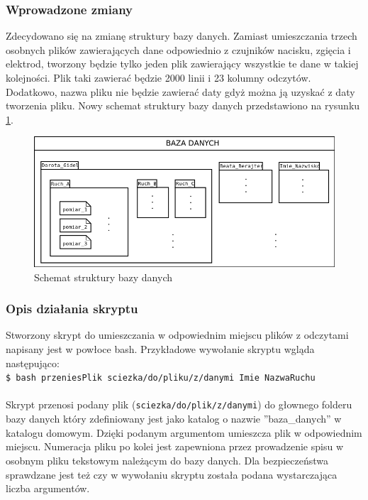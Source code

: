 \documentclass{article}
\begin{document}
\subsubsection{Wprowadzone zmiany}
Zdecydowano się na zmianę struktury bazy danych. Zamiast umieszczania trzech osobnych plików zawierających dane odpowiednio z czujników nacisku, zgięcia i elektrod, tworzony będzie tylko jeden plik zawierający wszystkie te dane w takiej kolejności. Plik taki zawierać będzie 2000 linii i 23 kolumny odczytów. Dodatkowo, nazwa pliku nie będzie zawierać daty gdyż można ją uzyskać z daty tworzenia pliku. Nowy schemat struktury bazy danych przedstawiono na rysunku \ref{rys:baza_danych}.
\begin{figure}[H]
    \centering
    \includegraphics[width=\textwidth]{baza_danych.png}
    \caption{Schemat struktury bazy danych}
    \label{rys:baza_danych}
\end{figure}

\subsubsection{Opis działania skryptu}
Stworzony skrypt do umieszczania w odpowiednim miejscu plików z odczytami napisany jest w powłoce bash. Przykładowe wywołanie skryptu wgląda następująco:\\

\texttt{\$ bash przeniesPlik sciezka/do/pliku/z/danymi Imie NazwaRuchu}\\ \\
Skrypt przenosi podany plik (\texttt{sciezka/do/plik/z/danymi}) do głownego folderu bazy danych który zdefiniowany jest jako katalog o nazwie ''baza\_danych'' w katalogu domowym. Dzięki podanym argumentom umieszcza plik w odpowiednim miejscu. Numeracja pliku po kolei jest zapewniona przez prowadzenie spisu w osobnym pliku tekstowym należącym do bazy danych. Dla bezpieczeństwa sprawdzane jest też czy w wywołaniu skryptu została podana wystarczająca liczba argumentów.
\end{document}
